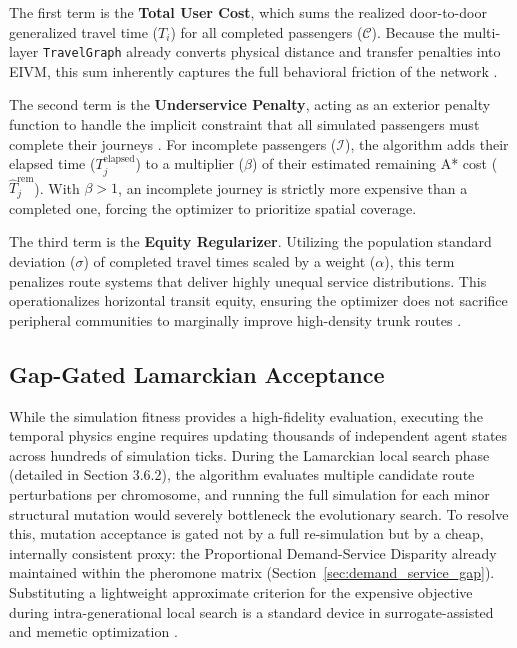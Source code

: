 {{The first term is the \textbf{Total User Cost}, which sums the realized door-to-door generalized travel time ($T_i$) for all completed passengers ($\mathcal{C}$). Because the multi-layer \texttt{TravelGraph} already converts physical distance and transfer penalties into \ac{EIVM}, this sum inherently captures the full behavioral friction of the network \citep{ortuzar2011modelling}.

The second term is the \textbf{Underservice Penalty}, acting as an exterior penalty function to handle the implicit constraint that all simulated passengers must complete their journeys \citep{coello2002theoretical}. For incomplete passengers ($\mathcal{I}$), the algorithm adds their elapsed time ($T_j^{\text{elapsed}}$) to a multiplier ($\beta$) of their estimated remaining A* cost ($\hat{T}_j^{\text{rem}}$). With $\beta > 1$, an incomplete journey is strictly more expensive than a completed one, forcing the optimizer to prioritize spatial coverage.

The third term is the \textbf{Equity Regularizer}. Utilizing the population standard deviation ($\sigma$) of completed travel times scaled by a weight ($\alpha$), this term penalizes route systems that deliver highly unequal service distributions. This operationalizes horizontal transit equity, ensuring the optimizer does not sacrifice peripheral communities to marginally improve high-density trunk routes \citep{welch2013measure}.

\subsection{Gap-Gated Lamarckian Acceptance}
\noindent While the simulation fitness provides a high-fidelity evaluation, executing the temporal physics engine requires updating thousands of independent agent states across hundreds of simulation ticks. During the Lamarckian local search phase (detailed in Section 3.6.2), the algorithm evaluates multiple candidate route perturbations per chromosome, and running the full simulation for each minor structural mutation would severely bottleneck the evolutionary search. To resolve this, mutation acceptance is gated not by a full re-simulation but by a cheap, internally consistent proxy: the Proportional Demand-Service Disparity already maintained within the pheromone matrix (Section~\ref{sec:demand_service_gap}). Substituting a lightweight approximate criterion for the expensive objective during intra-generational local search is a standard device in surrogate-assisted and memetic optimization \citep{jin2005survey}.

}}
